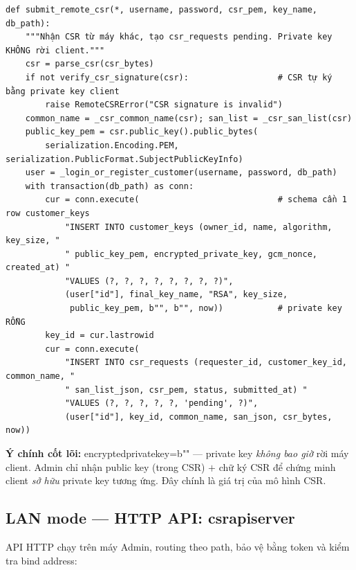 \documentclass[12pt,a4paper]{article}
\newcommand{\code}[1]{{\ttfamily\small\def\_{\textunderscore\discretionary{}{}{}}#1}}
\begin{document}
\begin{Verbatim}
def submit_remote_csr(*, username, password, csr_pem, key_name, db_path):
    """Nhận CSR từ máy khác, tạo csr_requests pending. Private key KHÔNG rời client."""
    csr = parse_csr(csr_bytes)
    if not verify_csr_signature(csr):                  # CSR tự ký bằng private key client
        raise RemoteCSRError("CSR signature is invalid")
    common_name = _csr_common_name(csr); san_list = _csr_san_list(csr)
    public_key_pem = csr.public_key().public_bytes(
        serialization.Encoding.PEM, serialization.PublicFormat.SubjectPublicKeyInfo)
    user = _login_or_register_customer(username, password, db_path)
    with transaction(db_path) as conn:
        cur = conn.execute(                            # schema cần 1 row customer_keys
            "INSERT INTO customer_keys (owner_id, name, algorithm, key_size, "
            " public_key_pem, encrypted_private_key, gcm_nonce, created_at) "
            "VALUES (?, ?, ?, ?, ?, ?, ?, ?)",
            (user["id"], final_key_name, "RSA", key_size,
             public_key_pem, b"", b"", now))           # private key RỖNG
        key_id = cur.lastrowid
        cur = conn.execute(
            "INSERT INTO csr_requests (requester_id, customer_key_id, common_name, "
            " san_list_json, csr_pem, status, submitted_at) "
            "VALUES (?, ?, ?, ?, ?, 'pending', ?)",
            (user["id"], key_id, common_name, san_json, csr_bytes, now))
\end{Verbatim}

\textbf{Ý chính cốt lõi:} \code{encrypted\_private\_key=b""} --- private key
\emph{không bao giờ} rời máy client. Admin chỉ nhận public key (trong CSR) $+$
chữ ký CSR để chứng minh client \emph{sở hữu} private key tương ứng. Đây chính là
giá trị của mô hình CSR.

\subsection{LAN mode --- HTTP API: \code{csr\_api\_server}}

API HTTP chạy trên máy Admin, routing theo path, bảo vệ bằng token và kiểm tra
bind address:
\end{document}
